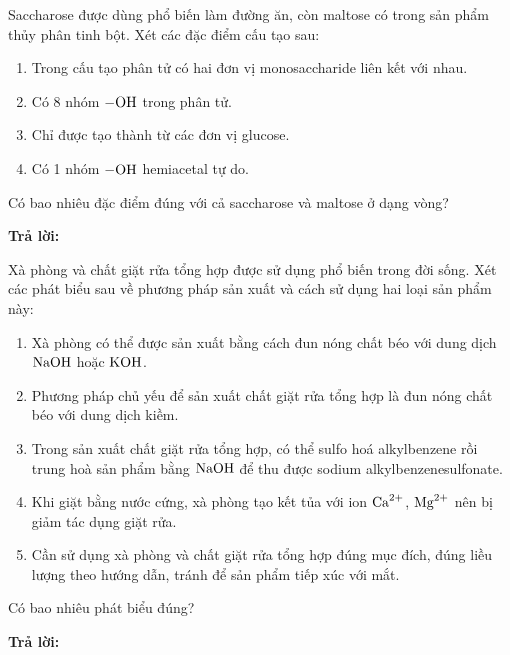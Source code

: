 \documentclass[11pt,a4paper]{article}
\begin{document}
\begin{ex}
Saccharose được dùng phổ biến làm đường ăn, còn maltose có trong sản phẩm thủy phân tinh bột. Xét các đặc điểm cấu tạo sau:
\begin{enumerate}[label=(\arabic*),itemsep=1pt,leftmargin=1.8cm]
\item Trong cấu tạo phân tử có hai đơn vị monosaccharide liên kết với nhau.
\item Có 8 nhóm $\ce{-OH}$ trong phân tử.
\item Chỉ được tạo thành từ các đơn vị glucose.
\item Có 1 nhóm $\ce{-OH}$ hemiacetal tự do.
\end{enumerate}
Có bao nhiêu đặc điểm đúng với cả saccharose và maltose ở dạng vòng?


\par\noindent\textbf{Trả lời:} \dotfill

\end{ex}

\begin{ex}
Xà phòng và chất giặt rửa tổng hợp được sử dụng phổ biến trong đời sống. Xét các phát biểu sau về phương pháp sản xuất và cách sử dụng hai loại sản phẩm này:
\begin{enumerate}[label=\alph*),itemsep=1pt,leftmargin=1.5cm]
\item Xà phòng có thể được sản xuất bằng cách đun nóng chất béo với dung dịch $\ce{NaOH}$ hoặc $\ce{KOH}$.
\item Phương pháp chủ yếu để sản xuất chất giặt rửa tổng hợp là đun nóng chất béo với dung dịch kiềm.
\item Trong sản xuất chất giặt rửa tổng hợp, có thể sulfo hoá alkylbenzene rồi trung hoà sản phẩm bằng $\ce{NaOH}$ để thu được sodium alkylbenzenesulfonate.
\item Khi giặt bằng nước cứng, xà phòng tạo kết tủa với ion $\ce{Ca^2+}$, $\ce{Mg^2+}$ nên bị giảm tác dụng giặt rửa.
\item Cần sử dụng xà phòng và chất giặt rửa tổng hợp đúng mục đích, đúng liều lượng theo hướng dẫn, tránh để sản phẩm tiếp xúc với mắt.
\end{enumerate}
Có bao nhiêu phát biểu đúng?


\par\noindent\textbf{Trả lời:} \dotfill

\end{ex}
\end{document}

